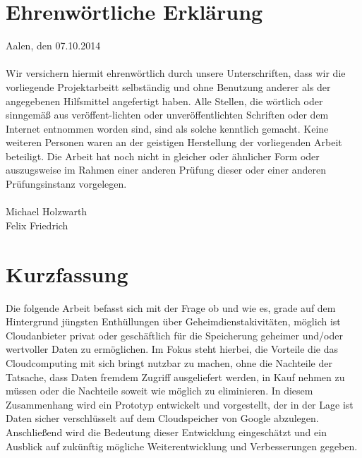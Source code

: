 \documentclass[13pt,a4paper,bibliography=totocnumbered,listof=totocnumbered]{scrartcl}
\begin{document}
\setcounter{page}{1}
\onehalfspacing
{}

\section{Ehrenwörtliche Erklärung}
Aalen, den 07.10.2014\\\\
Wir versichern hiermit ehrenwörtlich durch unsere Unterschriften, dass wir die vorliegende Projektarbeitt selbständig und ohne Benutzung anderer als der angegebenen Hilfsmittel angefertigt haben. Alle Stellen, die wörtlich oder sinngemäß aus veröffent-lichten oder unveröffentlichten Schriften oder dem Internet entnommen worden sind, sind als solche kenntlich gemacht. Keine weiteren Personen waren an der geistigen Herstellung der vorliegenden Arbeit beteiligt. Die Arbeit hat noch nicht in gleicher oder ähnlicher Form oder auszugsweise im Rahmen einer anderen Prüfung dieser oder einer anderen Prüfungsinstanz vorgelegen.\\\\

Michael Holzwarth\\


Felix Friedrich
\pagebreak

\section{Kurzfassung}
Die folgende Arbeit befasst sich mit der Frage ob und wie es, grade auf dem Hintergrund jüngsten Enthüllungen über Geheimdienstakivitäten, möglich ist Cloudanbieter privat oder geschäftlich für die Speicherung geheimer und/oder wertvoller Daten zu ermöglichen. Im Fokus steht hierbei, die Vorteile die das Cloudcomputing mit sich bringt nutzbar zu machen, ohne die Nachteile der Tatsache, dass Daten fremdem Zugriff ausgeliefert werden, in Kauf nehmen zu müssen oder die Nachteile soweit wie möglich zu eliminieren. In diesem Zusammenhang wird ein Prototyp entwickelt und vorgestellt, der in der Lage ist Daten sicher verschlüsselt auf dem Cloudspeicher von Google abzulegen. Anschließend wird die Bedeutung dieser Entwicklung eingeschätzt und ein Ausblick auf zukünftig mögliche Weiterentwicklung und Verbesserungen gegeben.
\pagebreak
\end{document}
